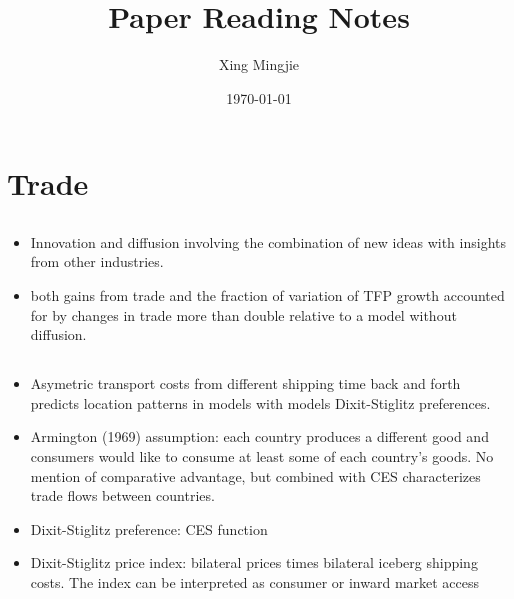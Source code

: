 \documentclass[10pt]{article} %
\title{Paper Reading Notes}
\author{Xing Mingjie}
\date{\today} %
\begin{document}
\maketitle

\tableofcontents

\newpage

\section{Trade}

    \subsection{\cite{BueraOberfield2020}}
    \begin{itemize}
        \item Innovation and diffusion involving the combination of new ideas with insights from other industries.
        \item both gains from trade and the fraction of variation of TFP growth accounted for by changes in trade more than double relative to a model without diffusion.
    \end{itemize}

    \subsection{\cite{ChenIoannidesRauch2022}}
    \begin{itemize}
        \item Asymetric transport costs from different shipping time back and forth predicts location patterns in models with models Dixit-Stiglitz preferences.
        \item Armington (1969) assumption: each country produces a different good and consumers would like to consume at least some of each country's goods. No mention of comparative advantage, but combined with CES characterizes trade flows between countries.
        \item Dixit-Stiglitz preference: CES function
        \item Dixit-Stiglitz price index: bilateral prices times bilateral iceberg shipping costs. The index can be interpreted as consumer or inward market access
    \end{itemize}
\end{document}
